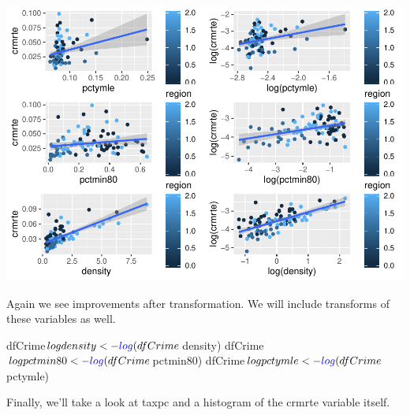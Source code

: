 \documentclass[]{article}
\newenvironment{Shaded}{}{}
\newcommand{\KeywordTok}[1]{\textcolor[rgb]{0.00,0.00,1.00}{#1}}
\newcommand{\NormalTok}[1]{#1}
\newcommand{\OperatorTok}[1]{#1}
\newcommand{\StringTok}[1]{\textcolor[rgb]{0.00,0.50,0.50}{#1}}
\begin{document}
\includegraphics{Bagnard_Gaustad_Hartman_Leung_Lab_3_files/figure-latex/unnamed-chunk-51-1.pdf}

Again we see improvements after transformation. We will include
transforms of these variables as well.

\begin{Shaded}
\begin{Highlighting}[]
\NormalTok{dfCrime}\OperatorTok{$}\NormalTok{logdensity <-}\StringTok{ }\KeywordTok{log}\NormalTok{(dfCrime}\OperatorTok{$}\NormalTok{density)}
\NormalTok{dfCrime}\OperatorTok{$}\NormalTok{logpctmin80 <-}\StringTok{ }\KeywordTok{log}\NormalTok{(dfCrime}\OperatorTok{$}\NormalTok{pctmin80)}
\NormalTok{dfCrime}\OperatorTok{$}\NormalTok{logpctymle <-}\StringTok{ }\KeywordTok{log}\NormalTok{(dfCrime}\OperatorTok{$}\NormalTok{pctymle)}
\end{Highlighting}
\end{Shaded}

Finally, we'll take a look at taxpc and a histogram of the crmrte
variable itself.
\end{document}
